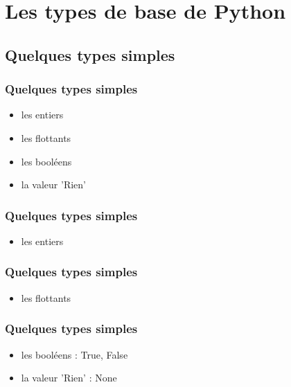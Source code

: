 \section{Les types de base de Python}
\subsection{Quelques types simples}

\begin{frame}
  \frametitle{Quelques types simples}
  \begin{itemize}
    \item<1-> les entiers
    \item<2-> les flottants
    \item<3-> les booléens
    \item<4-> la valeur 'Rien'
  \end{itemize}
\end{frame}

\begin{frame}[fragile]
  \frametitle{Quelques types simples}
  \begin{itemize}
    \item les entiers
  \end{itemize}
  \begin{ipython}
  \end{ipython}
\end{frame}

\begin{frame}[fragile]
  \frametitle{Quelques types simples}
  \begin{itemize}
    \item les flottants
  \end{itemize}
  \begin{ipython}
  \end{ipython}
\end{frame}

\begin{frame}
  \frametitle{Quelques types simples}
    \begin{itemize}
      \item les booléens : \alert{True, False}
      \item la valeur 'Rien' : \alert{None}
    \end{itemize}
\end{frame}

